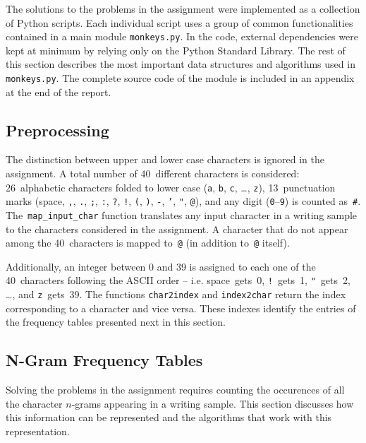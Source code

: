 \documentclass[conference]{IEEEtran}
\newcommand{\codeinline}[1]{{\fontsize{8}{0}\selectfont\texttt{#1}}}
\begin{document}
The solutions to the problems in the assignment were implemented as a collection of Python scripts.
Each individual script uses a group of common functionalities contained in a main module \codeinline{monkeys.py}.
In the code, external dependencies were kept at minimum by relying only on the Python Standard Library.
The rest of this section describes the most important data structures and algorithms used in \codeinline{monkeys.py}.
The complete source code of the module is included in an appendix at the end of the report.


\subsection{Preprocessing}

The distinction between upper and lower case characters is ignored in the assignment.
A total number of 40~different characters is considered: 
26~alphabetic characters folded to lower case (\codeinline{a}, \codeinline{b}, \codeinline{c}, \ldots, \codeinline{z}), 
13~punctuation marks (space, \codeinline{,}, \codeinline{.}, \codeinline{;}, \codeinline{:}, \codeinline{?}, \codeinline{!}, \codeinline{(}, \codeinline{)}, \codeinline{-}, \codeinline{'}, \codeinline{"}, \codeinline{@}),
and any digit (\codeinline{0}--\codeinline{9}) is counted as~\codeinline{\#}.
The~\codeinline{map\_input\_char} function translates any input character in a writing sample to the characters considered in the assignment.
A character that do not appear among the 40~characters is mapped to~\codeinline{@} (in addition to~\codeinline{@} itself).

Additionally, an integer between 0 and 39 is assigned to each one of the 40~characters following the ASCII order
-- i.e. space~gets~0, \codeinline{!}~gets~1, \codeinline{"}~gets~2, \ldots, and \codeinline{z}~gets~39.
The functions \codeinline{char2index} and \codeinline{index2char} return the index corresponding to a character and vice versa.
These indexes identify the entries of the frequency tables presented next in this section.


\subsection{N-Gram Frequency Tables}

Solving the problems in the assignment requires counting the occurences of all the character \mbox{\mbox{$n$-gram}s} appearing in a writing sample.
This section discusses how this information can be represented and the algorithms that work with this representation.
\end{document}
